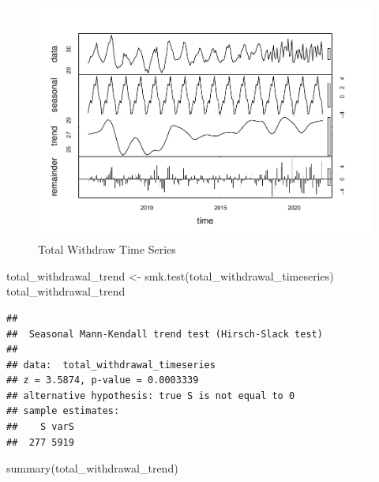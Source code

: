 \documentclass[
  12pt,
]{article}
\newenvironment{Shaded}{\begin{snugshade}}{\end{snugshade}}
\newcommand{\FunctionTok}[1]{\textcolor[rgb]{0.00,0.00,0.00}{#1}}
\newcommand{\NormalTok}[1]{#1}
\newcommand{\OtherTok}[1]{\textcolor[rgb]{0.56,0.35,0.01}{#1}}
\begin{document}
\begin{figure}
\centering
\includegraphics{Project_files/figure-latex/time-series analysis on withdrawals-1.pdf}
\caption{Total Withdraw Time Series}
\end{figure}

\begin{Shaded}
\begin{Highlighting}[]
\NormalTok{total\_withdrawal\_trend }\OtherTok{\textless{}{-}} \FunctionTok{smk.test}\NormalTok{(total\_withdrawal\_timeseries)}
\NormalTok{total\_withdrawal\_trend}
\end{Highlighting}
\end{Shaded}

\begin{verbatim}
## 
##  Seasonal Mann-Kendall trend test (Hirsch-Slack test)
## 
## data:  total_withdrawal_timeseries
## z = 3.5874, p-value = 0.0003339
## alternative hypothesis: true S is not equal to 0
## sample estimates:
##    S varS 
##  277 5919
\end{verbatim}

\begin{Shaded}
\begin{Highlighting}[]
\FunctionTok{summary}\NormalTok{(total\_withdrawal\_trend)}
\end{Highlighting}
\end{Shaded}
\end{document}
